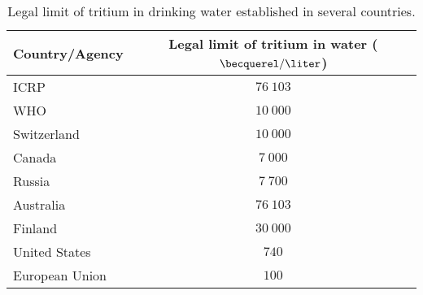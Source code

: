 \begin{table}[htbp]
\centering{}%
\begin{tabular}{lc}
\toprule 
Country/Agency & Legal limit of tritium in water ($\becquerel/\liter$) \tabularnewline
\midrule
\midrule 
ICRP & $76~103$ \tabularnewline
WHO & $10~000$ \tabularnewline
Switzerland & $10~000$ \tabularnewline
Canada & $7~000$ \tabularnewline
Russia & $7~700$ \tabularnewline
Australia & $76~103$ \tabularnewline
Finland & $30~000$ \tabularnewline
United States & $740$ \tabularnewline
European Union & $100$ \tabularnewline
\bottomrule
\end{tabular}
\caption{Legal limit of tritium in drinking water established in several countries.}
\label{tab:LegalLimitTritium}
\end{table}